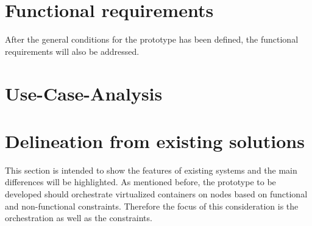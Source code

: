 \section{Functional requirements}
\label{section:functional-requirements}
After the general conditions for the prototype has been defined, the functional requirements will also be addressed.
%

\section{Use-Case-Analysis}
\label{section:use-case-analysis}
\doit

\section{Delineation from existing solutions}
\label{section:delineation-from-existing-solutions}
This section is intended to show the features of existing systems and the main differences will be highlighted.
As mentioned before, the prototype to be developed should orchestrate virtualized containers on nodes based on functional and non-functional constraints.
Therefore the focus of this consideration is the orchestration as well as the constraints.

